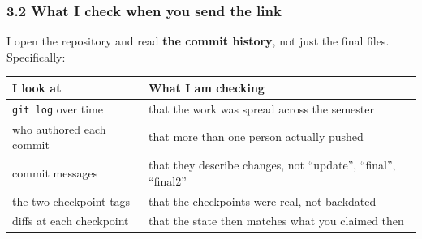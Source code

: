 \documentclass[11pt]{article}
\begin{document}
\hypertarget{what-i-check-when-you-send-the-link}{%
\subsubsection{3.2 What I check when you send the link}\label{what-i-check-when-you-send-the-link}}

I open the repository and read \textbf{the commit history}, not just the final files.
Specifically:

{\footnotesize
\begin{longtable}[]{@{}ll@{}}
\toprule
\begin{minipage}[b]{0.47\columnwidth}\raggedright
I look at\strut
\end{minipage} & \begin{minipage}[b]{0.47\columnwidth}\raggedright
What I am checking\strut
\end{minipage}\tabularnewline
\midrule
\endhead
\begin{minipage}[t]{0.47\columnwidth}\raggedright
\texttt{git\ log} over time\strut
\end{minipage} & \begin{minipage}[t]{0.47\columnwidth}\raggedright
that the work was spread across the semester\strut
\end{minipage}\tabularnewline
\begin{minipage}[t]{0.47\columnwidth}\raggedright
who authored each commit\strut
\end{minipage} & \begin{minipage}[t]{0.47\columnwidth}\raggedright
that more than one person actually pushed\strut
\end{minipage}\tabularnewline
\begin{minipage}[t]{0.47\columnwidth}\raggedright
commit messages\strut
\end{minipage} & \begin{minipage}[t]{0.47\columnwidth}\raggedright
that they describe changes, not ``update'', ``final'', ``final2''\strut
\end{minipage}\tabularnewline
\begin{minipage}[t]{0.47\columnwidth}\raggedright
the two checkpoint tags\strut
\end{minipage} & \begin{minipage}[t]{0.47\columnwidth}\raggedright
that the checkpoints were real, not backdated\strut
\end{minipage}\tabularnewline
\begin{minipage}[t]{0.47\columnwidth}\raggedright
diffs at each checkpoint\strut
\end{minipage} & \begin{minipage}[t]{0.47\columnwidth}\raggedright
that the state then matches what you claimed then\strut
\end{minipage}\tabularnewline
\bottomrule
\end{longtable}
}
\end{document}
